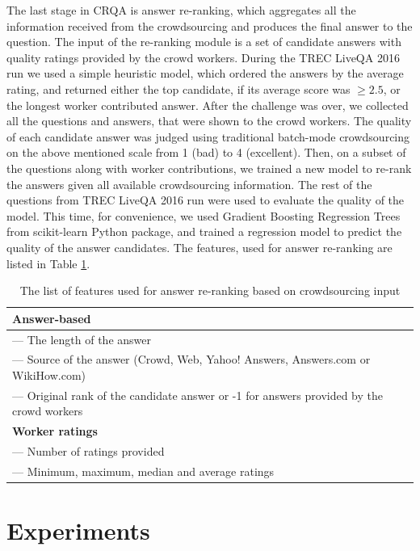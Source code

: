 \documentclass[letterpaper]{article}
\begin{document}
The last stage in CRQA is answer re-ranking, which aggregates all the information received from the crowdsourcing and produces the final answer to the question.
The input of the re-ranking module is a set of candidate answers with quality ratings provided by the crowd workers.
During the TREC LiveQA 2016 run we used a simple heuristic model, which ordered the answers by the average rating, and returned either the top candidate, if its average score was $\geq 2.5$, or the longest worker contributed answer.
After the challenge was over, we collected all the questions and answers, that were shown to the crowd workers.
The quality of each candidate answer was judged using traditional batch-mode crowdsourcing on the above mentioned scale from 1 (bad) to 4 (excellent).
Then, on a subset of the questions along with worker contributions, we trained a new model to re-rank the answers given all available crowdsourcing information.
The rest of the questions from TREC LiveQA 2016 run were used to evaluate the quality of the model.
This time, for convenience, we used Gradient Boosting Regression Trees~\cite{friedman2002stochastic} from scikit-learn Python package, and trained a regression model to predict the quality of the answer candidates.
The features, used for answer re-ranking are listed in Table \ref{table:reranking_features}.

\begin{table}[ht]
\centering
\begin{tabular}{| p{7.8cm} |}
\hline
\textbf{Answer-based} \\
\hline
--- The length of the answer \\
--- Source of the answer (Crowd, Web, Yahoo! Answers, Answers.com or WikiHow.com)\\
--- Original rank of the candidate answer or -1 for answers provided by the crowd workers\\
\hline
\textbf{Worker ratings} \\
\hline
--- Number of ratings provided\\
--- Minimum, maximum, median and average ratings\\
\hline
\end{tabular}
\caption{The list of features used for answer re-ranking based on crowdsourcing input}
\label{table:reranking_features}
\end{table}

\section{Experiments}
\label{sec:experiments}
\end{document}
